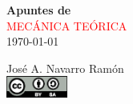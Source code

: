 %

\newcommand*{\titleTH}{\begingroup%
\raggedleft
\vspace*{\baselineskip}
{\bfseries Apuntes de}\\[\baselineskip]
{\textcolor{red}{\Huge MECÁNICA TEÓRICA}}\\[\baselineskip]
\vspace{2ex}
\today\par
\vspace*{4ex}
{\Large José A. Navarro Ramón}\\[0.167\textheight]
\vspace{5ex}
{\Large \includegraphics[width=2.0cm]{./img/by-sa.eps}}\par
\vspace*{3\baselineskip}
\endgroup}

\titleTH


